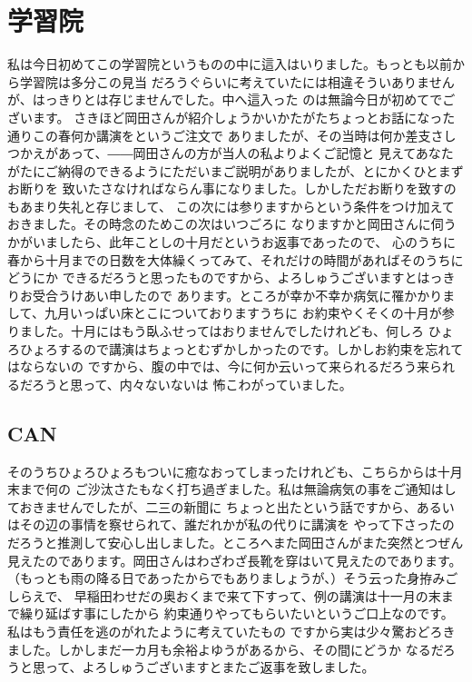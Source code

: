 \section{学習院}
  私は今日初めてこの学習院というものの中に這入はいりました。もっとも以前から学習院は多分この見当
  だろうぐらいに考えていたには相違そういありませんが、はっきりとは存じませんでした。中へ這入った
  のは無論今日が初めてでございます。
  さきほど岡田さんが紹介しょうかいかたがたちょっとお話になった通りこの春何か講演をというご注文で
  ありましたが、その当時は何か差支さしつかえがあって、――岡田さんの方が当人の私よりよくご記憶と
  見えてあなたがたにご納得のできるようにただいまご説明がありましたが、とにかくひとまずお断りを
  致いたさなければならん事になりました。しかしただお断りを致すのもあまり失礼と存じまして、
  この次には参りますからという条件をつけ加えておきました。その時念のためこの次はいつごろに
  なりますかと岡田さんに伺うかがいましたら、此年ことしの十月だというお返事であったので、
  心のうちに春から十月までの日数を大体繰くってみて、それだけの時間があればそのうちにどうにか
  できるだろうと思ったものですから、よろしゅうございますとはっきりお受合うけあい申したので
  あります。ところが幸か不幸か病気に罹かかりまして、九月いっぱい床とこについておりますうちに
  お約束やくそくの十月が参りました。十月にはもう臥ふせってはおりませんでしたけれども、何しろ
  ひょろひょろするので講演はちょっとむずかしかったのです。しかしお約束を忘れてはならないの
  ですから、腹の中では、今に何か云いって来られるだろう来られるだろうと思って、内々ないないは
  怖こわがっていました。

\subsection{CAN}
  そのうちひょろひょろもついに癒なおってしまったけれども、こちらからは十月末まで何の
  ご沙汰さたもなく打ち過ぎました。私は無論病気の事をご通知はしておきませんでしたが、二三の新聞に
  ちょっと出たという話ですから、あるいはその辺の事情を察せられて、誰だれかが私の代りに講演を
  やって下さったのだろうと推測して安心し出しました。ところへまた岡田さんがまた突然とつぜん
  見えたのであります。岡田さんはわざわざ長靴を穿はいて見えたのであります。
  （もっとも雨の降る日であったからでもありましょうが、）そう云った身拵みごしらえで、
  早稲田わせだの奥おくまで来て下すって、例の講演は十一月の末まで繰り延ばす事にしたから
  約束通りやってもらいたいというご口上なのです。私はもう責任を逃のがれたように考えていたもの
  ですから実は少々驚おどろきました。しかしまだ一カ月も余裕よゆうがあるから、その間にどうか
  なるだろうと思って、よろしゅうございますとまたご返事を致しました。

